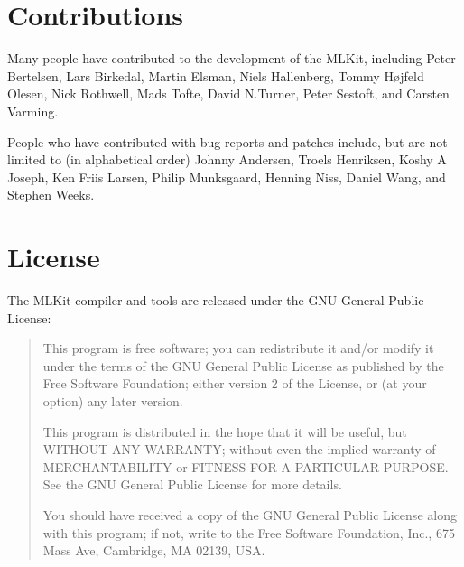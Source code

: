 \documentclass[12pt]{book}
\begin{document}
\newpage

\section*{Contributions}
Many people have contributed to the development of the MLKit,
including Peter Bertelsen, Lars Birkedal, Martin Elsman, Niels
Hallenberg, Tommy H\o jfeld Olesen, Nick Rothwell, Mads Tofte, David
N.\@ Turner, Peter Sestoft, and Carsten Varming.

People who have contributed with bug reports and patches include, but
are not limited to (in alphabetical order) Johnny Andersen, Troels
Henriksen, Koshy A Joseph, Ken Friis Larsen, Philip Munksgaard,
Henning Niss, Daniel Wang, and Stephen Weeks.

\section*{License}
The MLKit compiler and tools are released under the GNU General Public
License:

{\sc
\begin{quote}
  This program is free software; you can redistribute it and/or
  modify it under the terms of the GNU General Public License as
  published by the Free Software Foundation; either version 2 of the
  License, or (at your option) any later version.

  This program is distributed in the hope that it will be useful, but
  WITHOUT ANY WARRANTY; without even the implied warranty of
  MERCHANTABILITY or FITNESS FOR A PARTICULAR PURPOSE.  See the GNU
  General Public License for more details.

  You should have received a copy of the GNU General Public License
  along with this program; if not, write to the Free Software
  Foundation, Inc., 675 Mass Ave, Cambridge, MA 02139, USA.
\end{quote}
}
\end{document}
